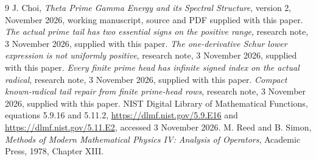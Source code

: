 \documentclass[11pt]{article}
\begin{document}
\begin{thebibliography}{9}
 J. Choi, \emph{Theta Prime Gamma Energy and its Spectral Structure}, version 2, November 2026, working manuscript, source and PDF supplied with this paper.
 \emph{The actual prime tail has two essential signs on the positive range}, research note, 3 November 2026, supplied with this paper.
 \emph{The one-derivative Schur lower expression is not uniformly positive}, research note, 3 November 2026, supplied with this paper.
 \emph{Every finite prime head has infinite signed index on the actual radical}, research note, 3 November 2026, supplied with this paper.
 \emph{Compact known-radical tail repair from finite prime-head rows}, research note, 3 November 2026, supplied with this paper.
 NIST Digital Library of Mathematical Functions, equations 5.9.16 and 5.11.2, \url{https://dlmf.nist.gov/5.9.E16} and \url{https://dlmf.nist.gov/5.11.E2}, accessed 3 November 2026.
 M. Reed and B. Simon, \emph{Methods of Modern Mathematical Physics IV: Analysis of Operators}, Academic Press, 1978, Chapter XIII.
\end{thebibliography}
\end{document}
